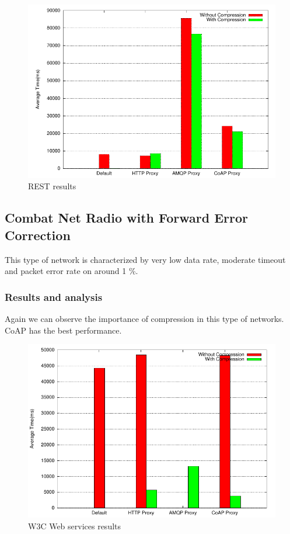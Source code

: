 \begin{figure}[H]
\center
\includegraphics[scale=0.75]{../results/wifi2/rest/result.pdf}
\caption{REST results}
\end{figure}

\subsection{Combat Net Radio with Forward Error Correction}

This type of network is characterized by very low data rate, moderate timeout
and packet error rate on around 1 \%.


\subsubsection{Results and analysis}

Again we can observe the importance of compression in this type of networks.
CoAP has the best performance.

\begin{figure}[H]
\center
\includegraphics[scale=0.75]{../results/cnr/nffi/result.pdf}
\caption{W3C Web services results}
\end{figure}

